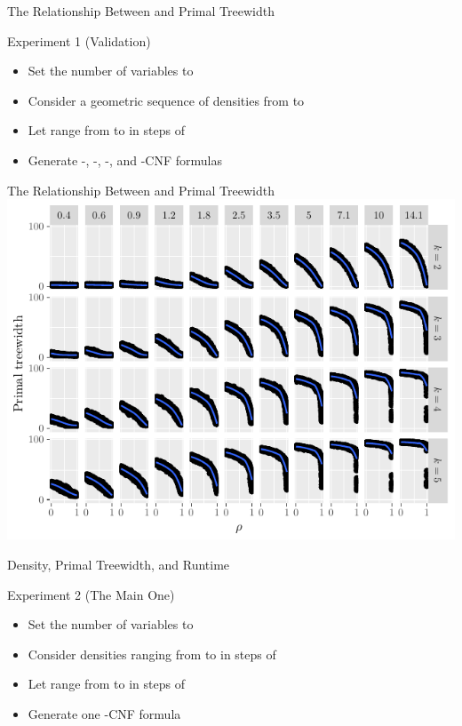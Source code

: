 \documentclass{beamer}
\begin{document}
\begin{frame}{The Relationship Between \structure{$\rho$} and Primal Treewidth}
  \begin{block}{Experiment 1 (Validation)}
    \begin{itemize}
      \item Set the number of variables to 
      \item Consider a geometric sequence of  densities from
             to 
      \item Let \structure{$\rho$} range from  to
             in steps of 
      \item Generate  -, -,
            -, and -CNF formulas
    \end{itemize}
  \end{block}
\end{frame}

\begin{frame}{The Relationship Between \structure{$\rho$} and Primal Treewidth}
  \includegraphics{regular_repetitiveness.pdf}
\end{frame}

\begin{frame}{Density, Primal Treewidth, and Runtime}
  \begin{block}{Experiment 2 (The Main One)}
    \begin{itemize}
      \item Set the number of variables to 
      \item Consider densities ranging from  to 
            in steps of 
      \item Let \structure{$\rho$} range from  to
             in steps of 
      \item Generate one -CNF formula
    \end{itemize}
  \end{block}
\end{frame}
\end{document}
